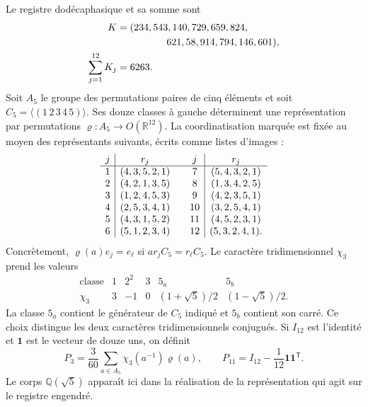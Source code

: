 Le registre dodécaphasique et sa somme sont
\begin{equation}
 \begin{split}
 K={}&(234,543,140,729,659,824,\\
     &\hspace{13mm}621,58,914,794,146,601),\\
 \sum_{j=1}^{12}K_j={}&6263.
 \end{split}
 \label{eq:leech-K}
\end{equation}
Soit \(A_5\) le groupe des permutations paires de cinq éléments et soit \(C_5=\langle(1\,2\,3\,4\,5)\rangle\). Ses douze classes à gauche déterminent une représentation par permutations \(\varrho:A_5\to O(\mathbb R^{12})\). La coordinatisation marquée est fixée au moyen des représentants suivants, écrits comme listes d'images :
\[
\begin{array}{c|c@{\qquad}c|c}
j&r_j&j&r_j\\ \hline
1&(4,3,5,2,1)&7&(5,4,3,2,1)\\
2&(4,2,1,3,5)&8&(1,3,4,2,5)\\
3&(1,2,4,5,3)&9&(4,2,3,5,1)\\
4&(2,5,3,4,1)&10&(3,2,5,4,1)\\
5&(4,3,1,5,2)&11&(4,5,2,3,1)\\
6&(5,1,2,3,4)&12&(5,3,2,4,1).
\end{array}
\]
Concrètement, \(\varrho(a)e_j=e_\ell\) si \(ar_jC_5=r_\ell C_5\). Le caractère tridimensionnel \(\chi_3\) prend les valeurs
\[
\begin{array}{c|ccccc}
\text{classe}&1&2^2&3&5_a&5_b\\ \hline
\chi_3&3&-1&0&(1+\sqrt5)/2&(1-\sqrt5)/2.
\end{array}
\]
La classe \(5_a\) contient le générateur de \(C_5\) indiqué et \(5_b\) contient son carré. Ce choix distingue les deux caractères tridimensionnels conjugués. Si \(I_{12}\) est l'identité et \(\mathbf1\) est le vecteur de douze uns, on définit
\begin{equation}
 P_3=\frac3{60}\sum_{a\in A_5}\chi_3(a^{-1})\varrho(a),
 \qquad
 P_{11}=I_{12}-\frac1{12}\mathbf1\mathbf1^{\mathsf T}.
 \label{eq:leech-projectors}
\end{equation}
Le corps \(\mathbb Q(\sqrt5)\) apparaît ici dans la réalisation de la
représentation qui agit sur le registre engendré.

